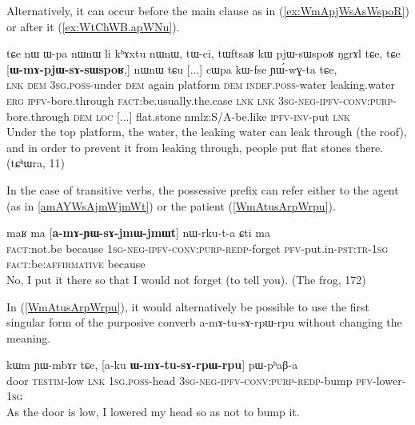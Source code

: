 \documentclass[oldfontcommands,oneside,a4paper,11pt]{article}
\newcommand{\ipa}[1]{{\phon \mbox{#1}}} %
\newcommand{\refb}[1]{(\ref{#1})}
\begin{document}
Alternatively, it can occur   before the main clause as in \refb{ex:WmApjWsAsWspoR} or after it \refb{ex:WtChWB.apWNu}.

\begin{exe}
\ex \label{ex:WmApjWsAsWspoR}
\gll
\ipa{tɕe}   	\ipa{nɯ}   	\ipa{ɯ-pa}   	\ipa{nɯnɯ}   	\ipa{li}   	\ipa{kʰɤxtu}   	\ipa{nɯnɯ,}   	\ipa{tɯ-ci,}   	\ipa{tɯftsaʁ}   	\ipa{kɯ}   	\ipa{pjɯ-sɯspoʁ}   	\ipa{ŋgrɤl}   	\ipa{tɕe,}    \ipa{tɕe}   	[\ipa{\textbf{ɯ-mɤ-pjɯ-sɤ-sɯspoʁ},}]   	\ipa{nɯnɯ}   	\ipa{tɕu}   [...] \ipa{cɯpa}   	\ipa{kɯ-fse}   	\ipa{ɲɯ́-wɣ-ta}   	\ipa{tɕe,}   \\
\textsc{lnk} \textsc{dem} \textsc{3sg.poss}-under \textsc{dem} again platform \textsc{dem} \textsc{indef.poss}-water leaking.water \textsc{erg} \textsc{ipfv}-bore.through \textsc{fact}:be.usually.the.case \textsc{lnk} \textsc{lnk} \textsc{3sg-neg-ipfv-conv:purp}-bore.through \textsc{dem} \textsc{loc} [...] flat.stone nm\textsc{}lz:S/A-be.like \textsc{ipfv-inv}-put \textsc{lnk} \\
\glt Under the top platform, the water, the leaking water can leak through (the roof), and in order to prevent it from leaking through, people put flat stones there. (tɕʰɯra, 11)
\end{exe}

In the case of transitive verbs, the possessive prefix can refer either to the agent (as in \ref{amAYWsAjmWjmWt}) or the patient \refb{WmAtusArpWrpu}.

\begin{exe}
\ex \label{amAYWsAjmWjmWt}
\gll 
\ipa{maʁ}   	\ipa{ma}   	[\ipa{\textbf{a-mɤ-ɲɯ-sɤ-jmɯ-jmɯt}}]   	\ipa{nɯ-rku-t-a}   	\ipa{ɕti}   	\ipa{ma}   \\
\textsc{fact}:not.be because \textsc{1sg-neg-ipfv-conv:purp-redp}-forget \textsc{pfv}-put.in-\textsc{pst:tr-1sg} \textsc{fact}:be:\textsc{affirmative} because \\
\glt No, I put it there so that I would not forget (to tell you). (The frog, 172)
\end{exe}

In \refb{WmAtusArpWrpu}, it would alternatively be possible to use the first singular form of the purposive converb \ipa{a-mɤ-tu-sɤ-rpɯ-rpu}   without changing the meaning.

 \begin{exe}
\ex \label{WmAtusArpWrpu}
\gll 
\ipa{kɯm}    	\ipa{ɲɯ-mbɤr}    	\ipa{tɕe,}    	[\ipa{a-ku}    	\textbf{\ipa{ɯ-mɤ-tu-sɤ-rpɯ-rpu}}]    	\ipa{pɯ-pʰaβ-a}    \\
door \textsc{testim}-low \textsc{lnk} \textsc{1sg.poss}-head \textsc{3sg-neg-ipfv-conv:purp-redp}-bump \textsc{pfv}-lower-\textsc{1sg}\\
\glt As the door is low, I lowered my head so as not to bump it.
\end{exe}
\end{document}
